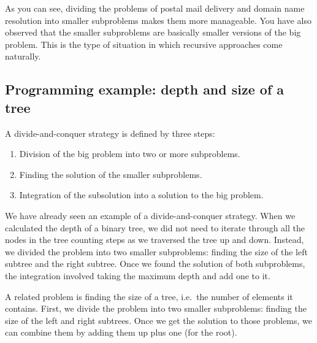 As you can see, dividing the problems of postal mail delivery and
domain name resolution into smaller subproblems makes them more
manageable. You have also observed that the smaller subproblems are
basically smaller versions of the big problem. This is the type of
situation in which recursive approaches come naturally. 

\subsection{Programming example: depth and size of a tree}
\label{sec:progr-exampl-depth}

A divide-and-conquer strategy is defined by three steps: 

\begin{enumerate}
\item Division of the big problem into two or more subproblems.
\item Finding the solution of the smaller subproblems.
\item Integration of the subsolution into a solution to the big
  problem. 
\end{enumerate}

We have already seen an example of a divide-and-conquer strategy. When
we calculated the depth of a binary tree, we did not need to iterate through
all the nodes in the tree counting steps as we traversed the tree up
and down. Instead, we divided the problem into two smaller
subproblems: finding the size of the left subtree and the right
subtree. Once we found the solution of both subproblems, the
integration involved taking the maximum depth and add one to it. 

A related problem is finding the size of a tree, i.e.~the number of
elements it contains. First, we divide the problem into two smaller
subproblems: finding the size of the left and right subtrees. Once we
get the solution to those problems, we can combine them by adding them
up plus one (for the root). 



